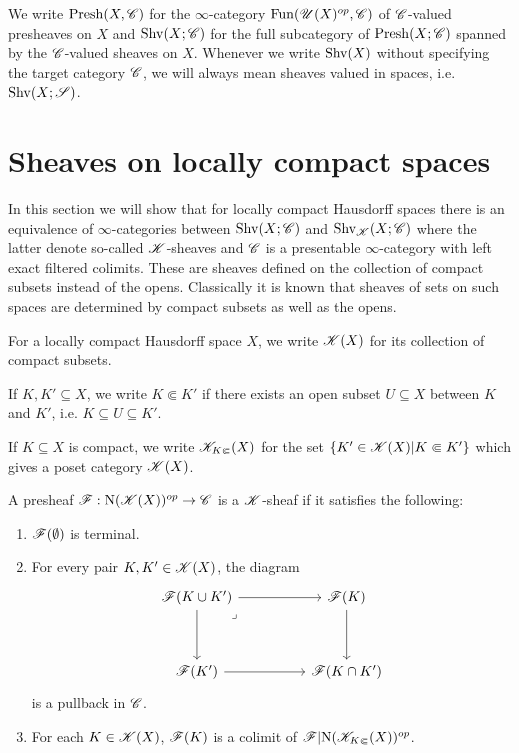 \documentclass[../../thesis.tex]{subfiles}
\begin{document}
We write $\mathrm{Presh}(X, \mathscr{C})$ for the $\infty$-category $\mathrm{Fun}(\mathscr{U}(X)^{op}, \mathscr{C})$ of $\mathscr{C}$-valued presheaves on $X$ and $\mathrm{Shv}(X;\mathscr{C})$ for the full subcategory of $\mathrm{Presh}(X;\mathscr{C})$ spanned by the $\mathscr{C}$-valued sheaves on $X$.
Whenever we write $\mathrm{Shv}(X)$ without specifying the target category $\mathscr{C}$, we will always mean sheaves valued in spaces, i.e. $\mathrm{Shv}(X;\mathscr{S})$.
\section{Sheaves on locally compact spaces}
In this section we will show that for locally compact Hausdorff spaces there is an equivalence of $\infty$-categories between $\mathrm{Shv}(X;\mathscr{C})$ and $\mathrm{Shv}_{\mathscr{K}}(X;\mathscr{C})$ where the latter denote so-called $\mathscr{K}$-sheaves and $\mathscr{C}$ is a presentable $\infty$-category with left exact filtered colimits.
These are sheaves defined on the collection of compact subsets instead of the opens.
Classically it is known that sheaves of sets on such spaces are determined by compact subsets as well as the opens.
\begin{definition}
    For a locally compact Hausdorff space $X$, we write $\mathscr{K}(X)$ for its collection of compact subsets.
\end{definition}
\begin{definition}
    If $K, K' \subseteq X$, we write $K \Subset K'$ if there exists an open subset $U\subseteq X$ between $K$ and $K'$, i.e. $K \subseteq U \subseteq K'$.
\end{definition}
\begin{definition}
    If $K\subseteq X$ is compact, we write $\mathscr{K}_{K\Subset}(X)$ for the set $\{ K'\in \mathscr{K}(X) | K \Subset K' \}$ which gives a poset category $\mathscr{K}(X)$.
\end{definition}
\begin{definition}
    A presheaf $\mathscr{F}:\mathrm{N}(\mathscr{K}(X))^{op}\to \mathscr{C}$ is a $\mathscr{K}$-sheaf if it satisfies the following:
    \begin{enumerate}
        \item $\mathscr{F}(\emptyset)$ is terminal.
        \item For every pair $K,K'\in \mathscr{K}(X)$, the diagram
              \[\begin{tikzcd}
                      {\F(K \cup K')} && {\F(K)} \\
                      \\
                      {\F(K')} && {\F(K\cap K')}
                      \arrow[from=1-3, to=3-3]
                      \arrow[from=3-1, to=3-3]
                      \arrow[from=1-1, to=3-1]
                      \arrow["\lrcorner"{anchor=center, pos=0.125}, draw=none, from=1-1, to=3-3]
                      \arrow[from=1-1, to=1-3]
                  \end{tikzcd}\]
              is a pullback in $\mathscr{C}$.
        \item For each $K\in \mathscr{K}(X)$, $\mathscr{F}(K)$ is a colimit of $\mathscr{F}|\mathrm{N}(\mathscr{K}_{K\Subset}(X))^{op}$.
    \end{enumerate}
\end{definition}
\end{document}
